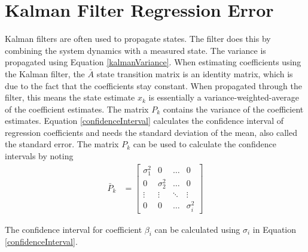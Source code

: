 \section*{Kalman Filter Regression Error}
Kalman filters are often used to propagate states. The filter does this by combining the system dynamics with a measured state. The variance is propagated using Equation \ref{kalmanVariance}. When estimating coefficients using the Kalman filter, the $\bar{A}$ state transition matrix is an identity matrix, which is due to the fact that the coefficients stay constant. When propagated through the filter, this means the state estimate $x_k$ is essentially a variance-weighted-average of the coefficient estimates. The matrix $P_k$ contains the variance of the coefficient estimates. Equation \ref{confidenceInterval} calculates the confidence interval of regression coefficients and needs the standard deviation of the mean, also called the standard error. The matrix $P_k$ can be used  to calculate the confidence intervals by noting
\begin{align}
\bar{P}_k &= \begin{bmatrix}
\sigma_{1}^2 &  0  & \ldots & 0\\
0  &  \sigma_{2}^2 & \ldots & 0\\
\vdots & \vdots & \ddots & \vdots\\
0  &   0       &\ldots & \sigma_i^2
\end{bmatrix}
\end{align}

The confidence interval for coefficient $\beta_i$ can be calculated using $\sigma_i$ in Equation \ref{confidenceInterval}.
